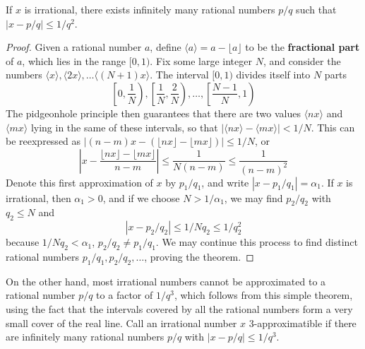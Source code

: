 \begin{theorem}
    If $x$ is irrational, there exists infinitely many rational numbers $p/q$ such that $|x - p/q| \leq 1/q^2$.
\end{theorem}
\begin{proof}
    Given a rational number $a$, define $\langle a \rangle = a - \lfloor a \rfloor$ to be the {\bf fractional part} of $a$, which lies in the range $[0,1)$. Fix some large integer $N$, and consider the numbers $\langle x \rangle, \langle 2x \rangle, \dots \langle (N+1)x \rangle$. The interval $[0,1)$ divides itself into $N$ parts
    \[ \left[0, \frac{1}{N} \right), \left[ \frac{1}{N}, \frac{2}{N} \right), \dots, \left[ \frac{N-1}{N},1 \right) \]
    The pidgeonhole principle then guarantees that there are two values $\langle nx \rangle$ and $\langle mx \rangle$ lying in the same of these intervals, so that $|\langle nx \rangle - \langle mx \rangle| < 1/N$. This can be reexpressed as $\left| (n-m)x - (\lfloor nx \rfloor - \lfloor mx \rfloor) \right| \leq 1/N$, or
    \[ \left| x - \frac{\lfloor nx \rfloor - \lfloor mx \rfloor}{n - m} \right| \leq \frac{1}{N(n-m)} \leq \frac{1}{(n-m)^2} \]
    Denote this first approximation of $x$ by $p_1/q_1$, and write $|x - p_1/q_1| = \alpha_1$. If $x$ is irrational, then $\alpha_1 > 0$, and if we choose $N > 1/\alpha_1$, we may find $p_2/q_2$ with $q_2 \leq N$ and
    \[ \left| x - p_2/q_2 \right| \leq 1/Nq_2 \leq 1/q_2^2 \]
    because $1/Nq_2 < \alpha_1$, $p_2/q_2 \neq p_1/q_1$. We may continue this process to find distinct rational numbers $p_1/q_1, p_2/q_2, \dots$, proving the theorem.
\end{proof}

On the other hand, most irrational numbers cannot be approximated to a rational number $p/q$ to a factor of $1/q^3$, which follows from this simple theorem, using the fact that the intervals covered by all the rational numbers form a very small cover of the real line. Call an irrational number $x$ 3-approximatible if there are infinitely many rational numbers $p/q$ with $|x - p/q| \leq 1/q^3$.

